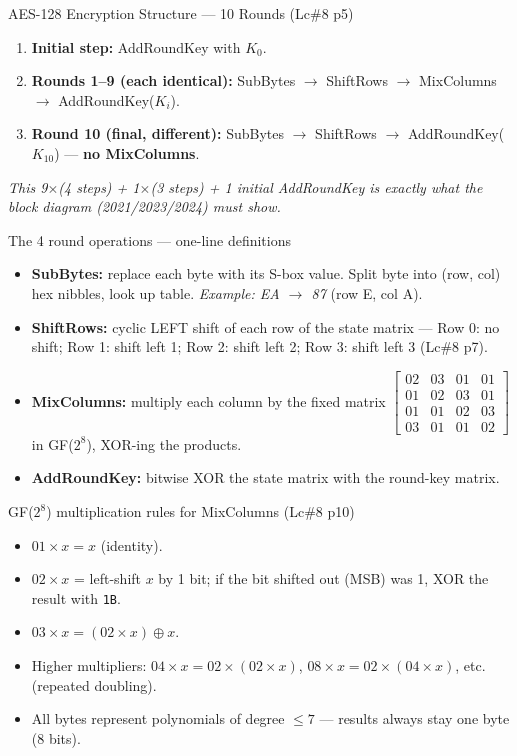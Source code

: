 \documentclass[12pt,a4paper]{article}
\begin{document}
\begin{algobox}{AES-128 Encryption Structure --- 10 Rounds (Lc\#8 p5)}
\begin{enumerate}[noitemsep]
  \item \textbf{Initial step:} AddRoundKey with $K_0$.
  \item \textbf{Rounds 1--9 (each identical):} SubBytes $\to$ ShiftRows $\to$ MixColumns $\to$ AddRoundKey($K_i$).
  \item \textbf{Round 10 (final, different):} SubBytes $\to$ ShiftRows $\to$ AddRoundKey($K_{10}$) --- \textbf{no MixColumns}.
\end{enumerate}
\textit{This 9$\times$(4 steps) + 1$\times$(3 steps) + 1 initial AddRoundKey is exactly what the block diagram (2021/2023/2024) must show.}
\end{algobox}

\begin{keybox}{The 4 round operations --- one-line definitions}
\begin{itemize}[noitemsep]
  \item \textbf{SubBytes:} replace each byte with its S-box value. Split byte into (row, col) hex nibbles, look up table. \textit{Example: EA $\to$ 87} (row E, col A).
  \item \textbf{ShiftRows:} cyclic LEFT shift of each row of the state matrix --- Row 0: no shift; Row 1: shift left 1; Row 2: shift left 2; Row 3: shift left 3 (Lc\#8 p7).
  \item \textbf{MixColumns:} multiply each column by the fixed matrix $\begin{bmatrix}02&03&01&01\\01&02&03&01\\01&01&02&03\\03&01&01&02\end{bmatrix}$ in GF($2^8$), XOR-ing the products.
  \item \textbf{AddRoundKey:} bitwise XOR the state matrix with the round-key matrix.
\end{itemize}
\end{keybox}

\begin{keybox}{GF($2^8$) multiplication rules for MixColumns (Lc\#8 p10)}
\begin{itemize}[noitemsep]
  \item $01 \times x = x$ (identity).
  \item $02 \times x$ = left-shift $x$ by 1 bit; if the bit shifted out (MSB) was 1, XOR the result with \texttt{1B}.
  \item $03 \times x = (02\times x)\oplus x$.
  \item Higher multipliers: $04\times x = 02\times(02\times x)$, $08\times x=02\times(04\times x)$, etc. (repeated doubling).
  \item All bytes represent polynomials of degree $\le 7$ --- results always stay one byte (8 bits).
\end{itemize}
\end{keybox}
\end{document}
